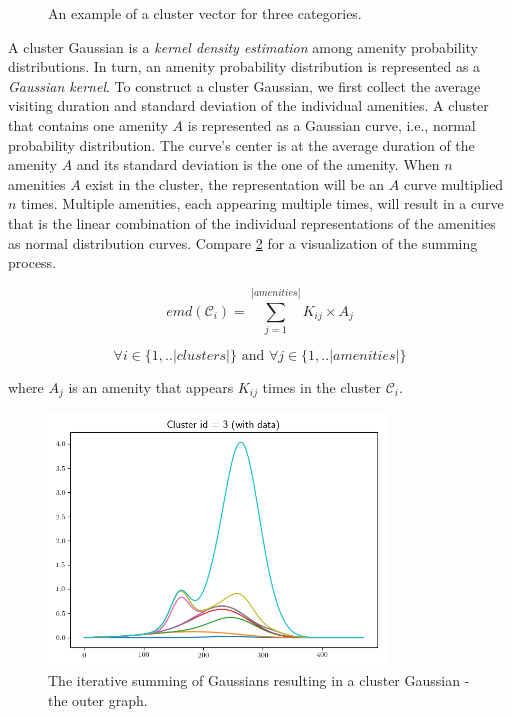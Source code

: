 \documentclass{ws-ijait}
\begin{document}
	\begin{figure}[!ht]
		\centering
		
		\caption{An example of a cluster vector for three categories.}
		\label{fig:cluster_vector}
	\end{figure}

	A cluster Gaussian is a \textit{kernel density estimation} among amenity probability distributions. In turn, an amenity probability distribution is represented as a \textit{Gaussian kernel}. To construct a cluster Gaussian, we first collect the average visiting duration and standard deviation of the individual amenities. A cluster that contains one amenity $A$ is represented as a Gaussian curve, i.e., normal probability distribution. The curve's center is at the average duration of the amenity $A$ and its standard deviation is the one of the amenity. When $n$ amenities $A$ exist in the cluster, the representation will be an $A$ curve multiplied $n$ times. Multiple amenities, each appearing multiple times, will result in a curve that is the linear combination of the individual representations of the amenities as normal distribution curves. Compare \cref{fig:gaussian} for a visualization of the summing process.
	
	\begin{equation}
	emd(\mathcal{C}_i) = \sum_{j=1}^{|amenities|} K_{ij} \times A_j
	\end{equation}
	
	$$\forall i \in \{1,..|clusters|\} \text{ and } \forall j \in \{1,..|amenities|\}$$
	
	where $A_j$ is an amenity that appears $K_{ij}$ times in the cluster $\mathcal{C}_i$.
	
	\begin{figure}[!ht]
		\centering
		\includegraphics[width=0.8\textwidth]{../graphics/emd_gaussian_addition3.png}
		\caption{The iterative summing of Gaussians resulting in a cluster Gaussian - the outer graph.}
		\label{fig:gaussian}
	\end{figure}
	
\end{document}
